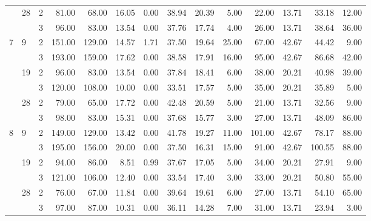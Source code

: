 \begin{tabular}{lllrrrrrrrrrrr}
\cline{2-14}
  & \multirow{2}{*}{28} & 2 &    81.00 &     68.00 & 16.05 &    0.00 &   38.94 &   20.39 &    5.00 &   22.00 &   13.71 &  33.18 &    12.00 \\
  &    & 3 &    96.00 &     83.00 & 13.54 &    0.00 &   37.76 &   17.74 &    4.00 &   26.00 &   13.71 &  38.64 &    36.00 \\
\cline{1-14}
\cline{2-14}
\multirow{6}{*}{7} & \multirow{2}{*}{9} & 2 &   151.00 &    129.00 & 14.57 &    1.71 &   37.50 &   19.64 &   25.00 &   67.00 &   42.67 &  44.42 &     9.00 \\
  &    & 3 &   193.00 &    159.00 & 17.62 &    0.00 &   38.58 &   17.91 &   16.00 &   95.00 &   42.67 &  86.68 &    42.00 \\
\cline{2-14}
  & \multirow{2}{*}{19} & 2 &    96.00 &     83.00 & 13.54 &    0.00 &   37.84 &   18.41 &    6.00 &   38.00 &   20.21 &  40.98 &    39.00 \\
  &    & 3 &   120.00 &    108.00 & 10.00 &    0.00 &   33.51 &   17.57 &    5.00 &   35.00 &   20.21 &  35.89 &     5.00 \\
\cline{2-14}
  & \multirow{2}{*}{28} & 2 &    79.00 &     65.00 & 17.72 &    0.00 &   42.48 &   20.59 &    5.00 &   21.00 &   13.71 &  32.56 &     9.00 \\
  &    & 3 &    98.00 &     83.00 & 15.31 &    0.00 &   37.68 &   15.77 &    3.00 &   27.00 &   13.71 &  48.09 &    86.00 \\
\cline{1-14}
\cline{2-14}
\multirow{6}{*}{8} & \multirow{2}{*}{9} & 2 &   149.00 &    129.00 & 13.42 &    0.00 &   41.78 &   19.27 &   11.00 &  101.00 &   42.67 &  78.17 &    88.00 \\
  &    & 3 &   195.00 &    156.00 & 20.00 &    0.00 &   37.50 &   16.31 &   15.00 &   91.00 &   42.67 & 100.55 &    88.00 \\
\cline{2-14}
  & \multirow{2}{*}{19} & 2 &    94.00 &     86.00 &  8.51 &    0.99 &   37.67 &   17.05 &    5.00 &   34.00 &   20.21 &  27.91 &     9.00 \\
  &    & 3 &   121.00 &    106.00 & 12.40 &    0.00 &   33.54 &   17.40 &    3.00 &   33.00 &   20.21 &  50.80 &    55.00 \\
\cline{2-14}
  & \multirow{2}{*}{28} & 2 &    76.00 &     67.00 & 11.84 &    0.00 &   39.64 &   19.61 &    6.00 &   27.00 &   13.71 &  54.10 &    65.00 \\
  &    & 3 &    97.00 &     87.00 & 10.31 &    0.00 &   36.11 &   14.28 &    7.00 &   31.00 &   13.71 &  23.94 &     3.00 \\
\cline{1-14}
\cline{2-14}

\end{tabular}
